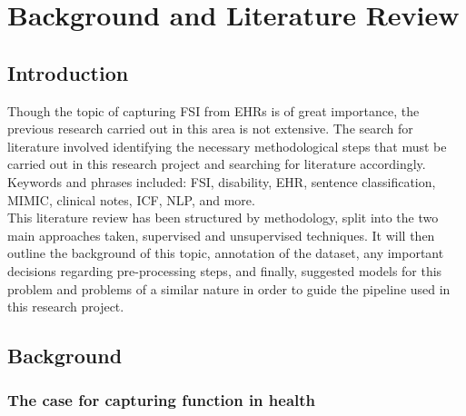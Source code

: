 


\chapter{Background and Literature Review}

\section{Introduction}

Though the topic of capturing FSI from EHRs is of great importance, the previous research carried out in this area is not extensive. The search for literature involved identifying the necessary methodological steps that must be carried out in this research project and searching for literature accordingly. Keywords and phrases included: FSI, disability, EHR, sentence classification, MIMIC, clinical notes, ICF, NLP, and more. \\

This literature review has been structured by methodology, split into the two main approaches taken, supervised and unsupervised techniques. It will then outline the background of this topic, annotation of the dataset, any important decisions regarding pre-processing steps, and finally, suggested models for this problem and problems of a similar nature in order to guide the pipeline used in this research project.

\section{Background}

\subsection{The case for capturing function in health}

